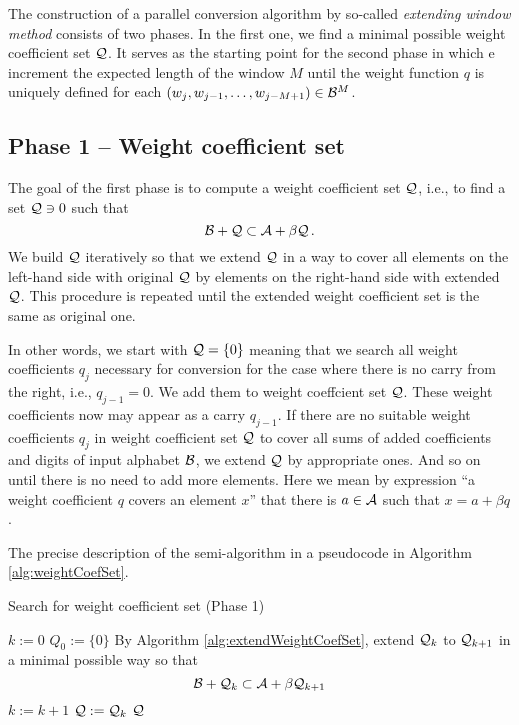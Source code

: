 The construction of a parallel conversion algorithm by so-called \emph{extending window method} consists of two phases. In the first one, we find a minimal possible weight coefficient set $\mathcal{Q}$. It serves as the starting point for the second phase in which e increment the expected length of the window $M$ until the weight function $q$ is uniquely defined for each $(w_j,w_{j-1}, \dots , w_{j-M+1}) \in \mathcal{B}^{M}$.

\subsection{Phase 1 -- Weight coefficient set}
The goal of the first phase is to compute a weight coefficient set $\mathcal{Q}$, i.e., to find a set $\mathcal{Q} \ni 0$ such that 
$$
    \mathcal{B} + \mathcal{Q} \subset \mathcal{A} + \beta \mathcal{Q}\,.
$$  
We build $\mathcal{Q}$ iteratively so that we extend $\mathcal{Q}$ in a way to cover all elements on the left-hand side with original $\mathcal{Q}$ by elements on the right-hand side with extended $\mathcal{Q}$. This procedure is repeated until the extended weight coefficient set is the same as original one. 

In other words, we start with $\mathcal{Q}=\{0\}$ meaning that we search all weight coefficients $q_j$ necessary for conversion for the case where there is no carry from the right, i.e., $q_{j-1}=0$. We add them to weight coeffcient set $\mathcal{Q}$. These weight coefficients now may appear as a carry $q_{j-1}$. If there are no suitable weight coefficients $q_j$ in weight coefficient set $\mathcal{Q}$ to cover all sums of added coefficients and digits of input alphabet $\mathcal{B}$, we extend $\mathcal{Q}$ by appropriate ones. And so on until there is no need to add more elements. Here we mean by expression ``a weight coefficient $q$ covers an element $x$'' that there is $a \in \mathcal{A}$ such that $x=a + \beta q$.
    
The precise description of the semi-algorithm in a pseudocode in Algorithm \ref{alg:weightCoefSet}.  
    
\begin{algorithm}
  \caption{Search for weight coefficient set (Phase 1)}
    \label{alg:weightCoefSet}
  \begin{algorithmic}
    \STATE $k:=0$ 
    \STATE $Q_0:=\{0\}$
    \REPEAT
     \STATE  By Algorithm \ref{alg:extendWeightCoefSet}, extend $\mathcal{Q}_k$ to $\mathcal{Q}_{k+1}$ in a minimal possible way so that $$\mathcal{B}+ \mathcal{Q}_k \subset \mathcal{A} + \beta \mathcal{Q}_{k+1}$$
     \vspace{-20pt}
      \STATE  $k:=k+1$
      \STATE $\mathcal{Q}:=\mathcal{Q}_k$
    \RETURN $\mathcal{Q}$
  \end{algorithmic}
\end{algorithm}

